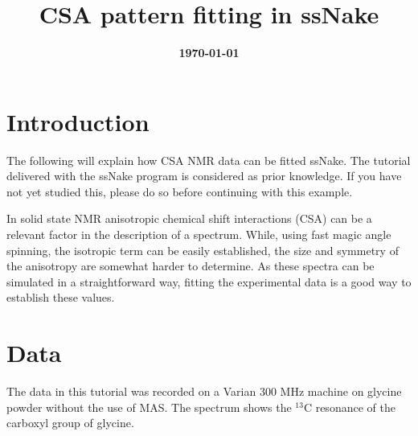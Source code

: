 \documentclass[11pt,a4paper]{article}
\title{\color{black}\fontfamily{SourceSansPro-LF}\bfseries CSA pattern fitting in ssNake}
\author{}
\date{\color{black}\fontfamily{SourceSansPro-LF}\bfseries \today}
\begin{document}

\maketitle

\section{Introduction}
The following will explain how CSA NMR data can be fitted ssNake.
 The
tutorial delivered with the ssNake program is considered as prior knowledge. If you have not yet
studied this, please do so before continuing with this example.

In solid state NMR anisotropic chemical shift interactions (CSA) can be a relevant factor in the
description of a spectrum. While, using fast magic angle spinning, the isotropic term can be easily
established, the size and symmetry of the anisotropy are somewhat harder to determine. As these
spectra can be simulated in a straightforward way, fitting the experimental data is a good way to
establish these values.


\section{Data}
The data in this tutorial was recorded on a Varian 300 MHz machine on glycine powder without the use
of MAS. The spectrum shows the $^{13}$C resonance of the carboxyl group of glycine.
\end{document}
